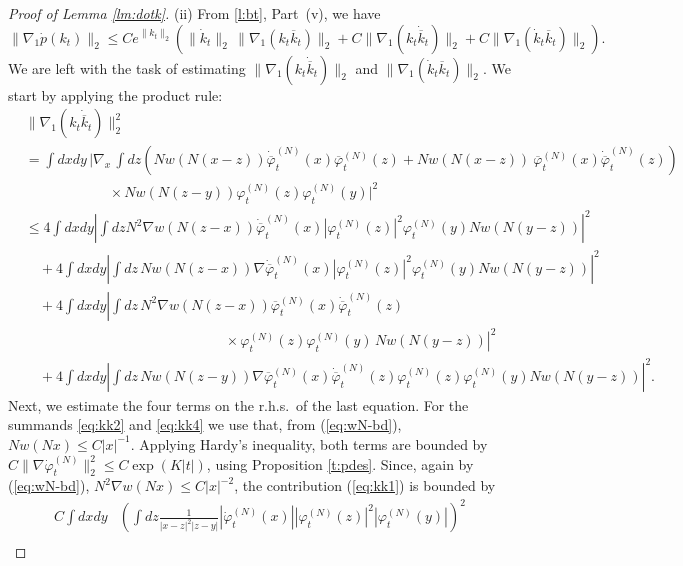 \documentclass[11pt,a4paper]{article}
\newcommand{\di}{{d}}		%
\newcommand{\cc}[1]{\overline{#1}}	%
\newcommand{\norm}[1]{\lVert#1\rVert}	%
\newcommand{\ph}{\varphi_t^{(N)}}	%
\newcommand{\phdot}{\dot{\varphi}_t^{(N)}}	%
\begin{document}
\begin{proof}[Proof of Lemma \ref{lm:dotk}]
(ii) {F}rom \ref{l:bt}, Part~(v), we have
\[\| \nabla_1 \dot p (k_t) \|_2 \leq C e^{\| k_t \|_2} \left( \| \dot k_t
\|_2 \,  \| \nabla_1 (k_t \overline{k}_t) \|_2 + C \| \nabla_1 (k_t
\dot{\overline{k}}_t) \|_2  + C \| \nabla_1 (\dot k_t \overline{k}_t) \|_2
\right). \]
We are left with the task of estimating $\| \nabla_1 (k_t \dot{\overline{k}}_t) \|_2$ and $\| \nabla_1 (\dot k_t \overline{k}_t) \|_2$. We start by applying the product rule:
\begin{align}
& \norm{\nabla_1 (k_t \dot{\overline{k}}_t)}_2^2  \nonumber \\
& = \int \di x \di y \, \bigg\lvert \nabla_x \, \int dz \left( N w(N(x-z)) \dot{\cc{\varphi}}_t^{(N)} (x) \cc{\varphi}_t^{(N)} (z) + N w(N(x-z))\ \cc{\varphi}_t^{(N)} (x) \dot{\cc{\varphi}}_t^{(N)} (z) \right) \nonumber \\
& \qquad\qquad\qquad \times N w(N(z-y)) {\ph(z)} {\ph(y)} \bigg\rvert^2 \nonumber \\
& \leq 4 \int \di x \di y \left\lvert \int dz N^2 \nabla w (N(z-x)) \dot{\cc{\varphi}}_t^{(N)} (x)  |\ph(z)|^2  \ph(y) N w (N(y-z)) \right|^2 \label{eq:kk1} \\
& \quad + 4 \int \di x \di y \left| \int dz \, N w (N(z-x)) \nabla \dot{\cc{\varphi}}_t^{(N)} (x) |\ph(z)|^2 \ph(y) N w (N(y-z)) \right|^2 \label{eq:kk2}\\
& \quad + 4 \int \di x \di y \left| \int dz \, N^2 \nabla w (N(z-x)) \cc{\varphi}_t^{(N)} (x) \dot{\cc{\varphi}}_t^{(N)} (z) \right. \nonumber \\ & \left. \hspace{6cm} \times \ph(z)  \ph(y) \, N w (N(y-z)) \right|^2 \label{eq:kk3}\\
& \quad + 4 \int \di x \di y \left| \int dz \, N w(N(z-y)) \nabla \cc{\varphi}_t^{(N)} (x) \dot{\cc{\varphi}}_t^{(N)} (z) \ph(z) \ph(y) N w(N(y-z)) \right|^2. \label{eq:kk4}
\end{align}
Next, we estimate the four terms on the r.h.s.\ of the last equation. For the summands \eqref{eq:kk2} and \eqref{eq:kk4} we use that, from (\ref{eq:wN-bd}), $N w(Nx) \leq C |x|^{-1}$. Applying Hardy's inequality, both terms are bounded by $C \norm{\nabla \phdot}_{2}^2 \leq C \exp (K |t|)$, using Proposition \ref{t:pdes}. Since, again by (\ref{eq:wN-bd}), $N^2 \nabla w (Nx)\leq C |x|^{-2}$, the contribution (\ref{eq:kk1}) is bounded by 
\begin{align*}
C \int \di x \di y &\left( \int \di z \frac{1}{|x-z|^2 |z-y|} |\dot{\varphi}_t^{(N)} (x)| |\ph(z)|^2 |\ph(y)|  \right)^2 \\

\end{align*}
\end{proof}
\end{document}
